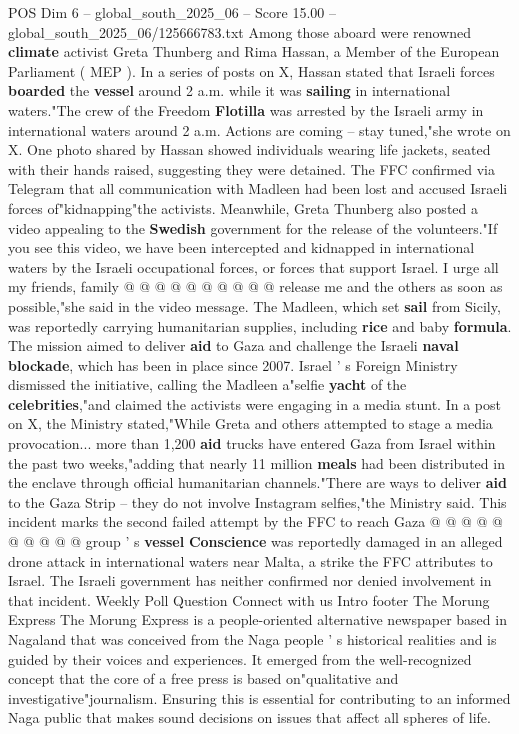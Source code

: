 \begin{textsample}{POS Dim 6 – global\_south\_2025\_06 – Score 15.00 – global\_south\_2025\_06/125666783.txt}  \label{ex:f6_pos_012}
Among those aboard were renowned \textbf{climate} activist Greta Thunberg and Rima Hassan, a Member of the European Parliament ( MEP ).
In a series of posts on X, Hassan stated that Israeli forces \textbf{boarded} the \textbf{vessel} around 2 a.m. while it was \textbf{sailing} in international waters."The crew of the Freedom \textbf{Flotilla} was arrested by the Israeli army in international waters around 2 a.m.
Actions are coming -- stay tuned,"she wrote on X.
One photo shared by Hassan showed individuals wearing life jackets, seated with their hands raised, suggesting they were detained.
The FFC confirmed via Telegram that all communication with Madleen had been lost and accused Israeli forces of"kidnapping"the activists.
Meanwhile, Greta Thunberg also posted a video appealing to the \textbf{Swedish} government for the release of the volunteers."If you see this video, we have been intercepted and kidnapped in international waters by the Israeli occupational forces, or forces that support Israel.
I urge all my friends, family @ @ @ @ @ @ @ @ @ @ release me and the others as soon as possible,"she said in the video message.
The Madleen, which set \textbf{sail} from Sicily, was reportedly carrying humanitarian supplies, including \textbf{rice} and baby \textbf{formula}.
The mission aimed to deliver \textbf{aid} to Gaza and challenge the Israeli \textbf{naval} \textbf{blockade}, which has been in place since 2007.
Israel ' s Foreign Ministry dismissed the initiative, calling the Madleen a"selfie \textbf{yacht} of the \textbf{celebrities},"and claimed the activists were engaging in a media stunt.
In a post on X, the Ministry stated,"While Greta and others attempted to stage a media provocation... more than 1,200 \textbf{aid} trucks have entered Gaza from Israel within the past two weeks,"adding that nearly 11 million \textbf{meals} had been distributed in the enclave through official humanitarian channels."There are ways to deliver \textbf{aid} to the Gaza Strip -- they do not involve Instagram selfies,"the Ministry said.
This incident marks the second failed attempt by the FFC to reach Gaza @ @ @ @ @ @ @ @ @ @ group ' s \textbf{vessel} \textbf{Conscience} was reportedly damaged in an alleged drone attack in international waters near Malta, a strike the FFC attributes to Israel.
The Israeli government has neither confirmed nor denied involvement in that incident.
Weekly Poll Question Connect with us Intro footer The Morung Express The Morung Express is a people-oriented alternative newspaper based in Nagaland that was conceived from the Naga people ' s historical realities and is guided by their voices and experiences.
It emerged from the well-recognized concept that the core of a free press is based on"qualitative and investigative"journalism.
Ensuring this is essential for contributing to an informed Naga public that makes sound decisions on issues that affect all spheres of life.

\end{textsample}
